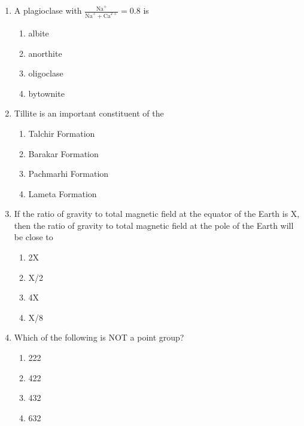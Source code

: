 \documentclass[journal,12pt,onecolumn]{IEEEtran}
\begin{document}
\begin{enumerate}
\item A plagioclase with $\frac{\text{Na}^{+}}{\text{Na}^{+}+\text{Ca}^{2+}}=0.8$ is

\hfill{}
\begin{multicols}{4}
\begin{enumerate}
    \item albite
    \item anorthite
    \item oligoclase
    \item bytownite
\end{enumerate}
\end{multicols}

\item Tillite is an important constituent of the

\hfill{}
\begin{multicols}{2}
\begin{enumerate}
    \item Talchir Formation
    \item Barakar Formation
    \item Pachmarhi Formation
    \item Lameta Formation
\end{enumerate}
\end{multicols}

\item If the ratio of gravity to total magnetic field at the equator of the Earth is X, then the ratio of gravity to total magnetic field at the pole of the Earth will be close to

\hfill{}
\begin{multicols}{4}
\begin{enumerate}
    \item 2X
    \item X/2
    \item 4X
    \item X/8
\end{enumerate}
\end{multicols}

\item Which of the following is NOT a point group?

\hfill{}
\begin{multicols}{4}
\begin{enumerate}
    \item 222
    \item 422
    \item 432
    \item 632
\end{enumerate}
\end{multicols}


\end{enumerate}
\end{document}
